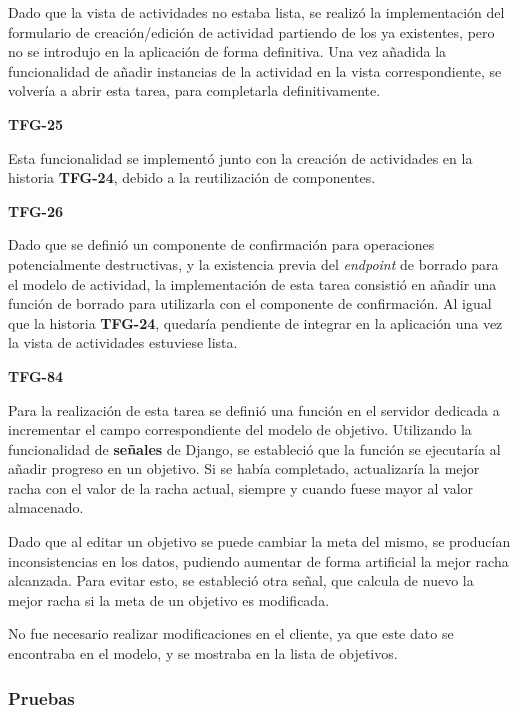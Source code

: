 \documentclass[10pt, a4paper]{aqademic}
\begin{document}
Dado que la vista de actividades no estaba lista, se realizó la implementación del formulario de creación/edición de actividad partiendo de los ya existentes, pero no se introdujo en la aplicación de forma definitiva. Una vez añadida la funcionalidad de añadir instancias de la actividad en la vista correspondiente, se volvería a abrir esta tarea, para completarla definitivamente.

\medskip

\textbf{TFG-25}

Esta funcionalidad se implementó junto con la creación de actividades en la historia \textbf{TFG-24}, debido a la reutilización de componentes.

\medskip

\textbf{TFG-26}

Dado que se definió un componente de confirmación para operaciones potencialmente destructivas, y la existencia previa del \textit{endpoint} de borrado para el modelo de actividad, la implementación de esta tarea consistió en añadir una función de borrado para utilizarla con el componente de confirmación. Al igual que la historia \textbf{TFG-24}, quedaría pendiente de integrar en la aplicación una vez la vista de actividades estuviese lista.

\medskip

\textbf{TFG-84}

Para la realización de esta tarea se definió una función en el servidor dedicada a incrementar el campo correspondiente del modelo de objetivo. Utilizando la funcionalidad de \textbf{señales} \cite{noauthor_signals_nodate} de Django, se estableció que la función se ejecutaría al añadir progreso en un objetivo. Si se había completado, actualizaría la mejor racha con el valor de la racha actual, siempre y cuando fuese mayor al valor almacenado.

Dado que al editar un objetivo se puede cambiar la meta del mismo, se producían inconsistencias en los datos, pudiendo aumentar de forma artificial la mejor racha alcanzada. Para evitar esto, se estableció otra señal, que calcula de nuevo la mejor racha si la meta de un objetivo es modificada.

No fue necesario realizar modificaciones en el cliente, ya que este dato se encontraba en el modelo, y se mostraba en la lista de objetivos.

\medskip

\subsubsection{Pruebas}
\end{document}
